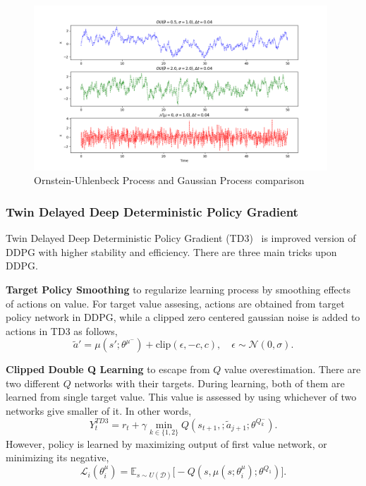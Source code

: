 \begin{figure}
	\centering
	\includegraphics[width=0.98\textwidth]{figures/others/random_processes.png}
	\caption{Ornstein-Uhlenbeck Process and Gaussian Process comparison}
	\label{fig:ou_vs_gaussian}
\end{figure}

\subsubsection{Twin Delayed Deep Deterministic Policy Gradient}
Twin Delayed Deep Deterministic Policy Gradient (TD3)~\cite{fujimoto_addressing_2018} is improved version of DDPG with higher stability and efficiency. 
There are three main tricks upon DDPG. 

\textbf{Target Policy Smoothing} to regularize learning process by smoothing effects of actions on value. For target value assesing, actions are obtained from target policy network in DDPG, while a clipped zero centered gaussian noise is added to actions in TD3 as follows,
\begin{equation}
\label{eqn:td3_target_action}
\widetilde{a}' = \mu(s';\theta^{\mu^-}) + \text{clip}(\epsilon, -c, c), \quad \epsilon \sim \mathcal{N}(0, \sigma).
\end{equation}

\textbf{Clipped Double Q Learning} to escape from $Q$ value overestimation. 
There are two different $Q$ networks with their targets. 
During learning, both of them are learned from single target value. 
This value is assessed by using whichever of two networks give smaller of it. In other words, 
\begin{equation}
\label{eqn:td3_target}
Y_t^{TD3} = r_t + \gamma \min_{k\in\{1,2\}} Q(s_{t+1}, ;\widetilde{a}_{j+1};\theta^{Q_k^-}).
\end{equation}
However, policy is learned by maximizing output of first value network, or minimizing its negative,
\begin{equation}
\label{eqn:td3_policy_loss}
\mathcal{L}_i(\theta^\mu_i) = \mathbb{E}_{s \sim U(\mathcal{D})} \Big[ -Q(s, \mu(s;\theta^\mu_i);\theta^{Q_1}) \Big].
\end{equation} 

